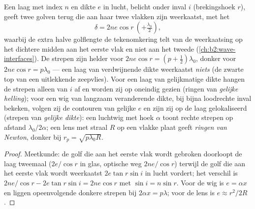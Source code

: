 \begin{proposition}\label{prop:b2:two-wave-interference:film}
Een laag met index $n$ en dikte $e$ in lucht, belicht onder inval $i$
(brekingshoek $r$), geeft twee golven terug die aan haar twee vlakken
zijn weerkaatst, met het 
\[
\delta = 2ne\cos r \ (+\tfrac{\lambda_0}2) ,
\]
waarbij de extra halve golflengte de tekenomkering telt van de
weerkaatsing op het dichtere midden aan het eerste vlak en niet aan het
tweede (\cref{ch:b2:wave-interfaces}). De strepen zijn helder voor
$2ne\cos r =
(p + \tfrac12)\lambda_0$, donker voor $2ne\cos r = p\lambda_0$
--- een laag
van verdwijnende dikte weerkaatst \emph{niets} (de zwarte top van een
uitlekkende zeepvlies). Voor een laag van gelijkmatige dikte hangen de
strepen alleen van $i$ af en worden zij op oneindig gezien (ringen van
\emph{gelijke helling}); voor een wig van langzaam veranderende dikte,
bij bijna loodrechte inval bekeken, volgen zij de contouren van gelijke
$e$ en zijn zij op de laag gelokaliseerd (strepen van \emph{gelijke
dikte}): een luchtwig met hoek $\alpha$ toont rechte strepen op afstand
$\lambda_0/2\alpha$; een lens met straal $R$ op een vlakke plaat geeft
\emph{ringen van Newton}, donker bij $r_p = \sqrt{p\lambda_0R}$.
\end{proposition}

\begin{proof}
Meetkunde: de golf die aan het eerste vlak wordt gebroken doorloopt de
laag tweemaal ($2e/\cos r$ in glas, optische weg $2ne/\cos r$) terwijl de
golf die aan het eerste vlak wordt weerkaatst $2e\tan r\sin i$ in lucht
vordert; het verschil is $2ne/\cos r - 2e\tan r\sin i = 2ne\cos r$ met
$\sin i = n\sin r$. Voor de wig is $e = \alpha x$ en liggen opeenvolgende
donkere strepen bij $2\alpha x = p\lambda$; voor de lens is $e \approx r^2/2R$.
\end{proof}

